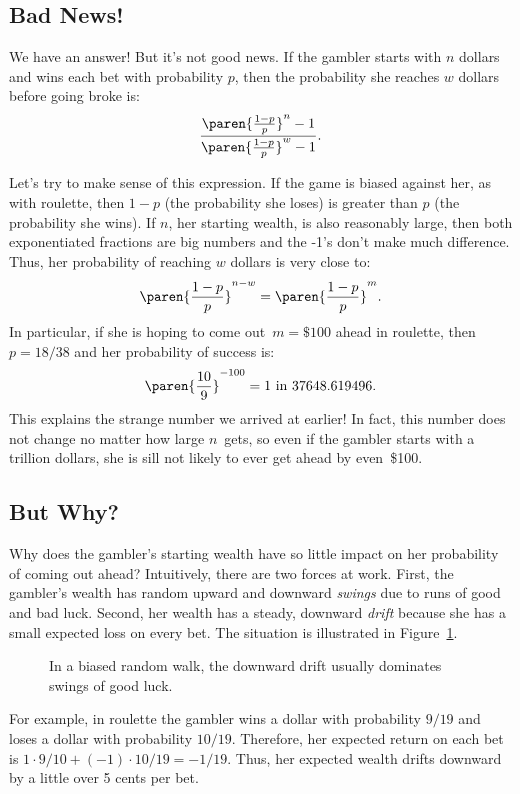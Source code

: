 \subsection{Bad News!}

We have an answer!  But it's not good news. If the gambler starts with
$n$ dollars and wins each bet with probability $p$, then the
probability she reaches $w$ dollars before going broke is:
%
\[
\frac{\paren{\frac{1-p}{p}}^n-1}{\paren{\frac{1-p}{p}}^w-1}.
\]

Let's try to make sense of this expression.  If the game is biased
against her, as with roulette, then $1-p$ (the probability she loses)
is greater than $p$ (the probability she wins).  If $n$, her starting
wealth, is also reasonably large, then both exponentiated fractions
are big numbers and the -1's don't make much difference.  Thus, her
probability of reaching $w$ dollars is very close to:
%
\[
    \paren{\frac{1-p}{p}}^{n-w} = \paren{\frac{1 - p}{p}}^m.
\]
%
In particular, if she is hoping to come out~$m = \$100$ ahead in
roulette, then $p = 18/38$ and her probability of success is:
%
\[
    \paren{\frac{10}{9}}^{-100} = 1 \text{ in } 37648.619496.
\]
%
This explains the strange number we arrived at earlier!  In fact, this
number does not change no matter how large $n$~gets, so even if the
gambler starts with a trillion dollars, she is sill not likely to ever
get ahead by even~\$100.

\subsection{But Why?}

Why does the gambler's starting wealth have so little impact on her
probability of coming out ahead?  Intuitively, there are two forces at
work.  First, the gambler's wealth has random upward and downward
\emph{swings} due to runs of good and bad luck.  Second, her wealth
has a steady, downward \emph{drift} because she has a small expected
loss on every bet.  The situation is illustrated in
Figure~\ref{fig:19P3}.
%
\begin{figure}[h]


\caption{In a biased random walk, the downward drift usually dominates
  swings of good luck.}

\label{fig:19P3}

\end{figure}

For example, in roulette the gambler wins a dollar with probability
$9/19$ and loses a dollar with probability $10/19$.  Therefore, her
expected return on each bet is $1 \cdot 9/10 + (-1) \cdot 10/19 = -
1/19$.  Thus, her expected wealth drifts downward by a little over 5
cents per bet.

